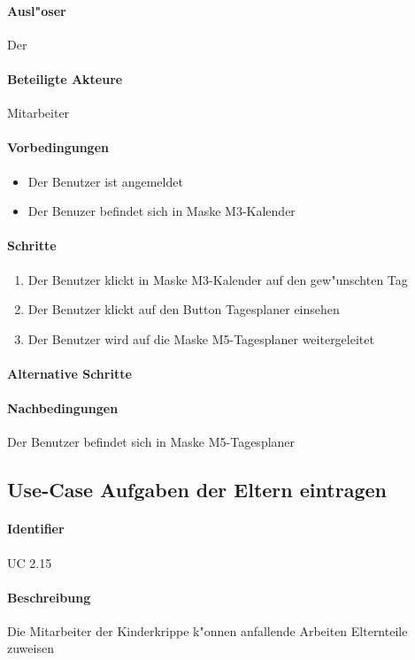   \paragraph{Ausl"oser}
  Der 
  \paragraph{Beteiligte Akteure}   \leavevmode \newline
    Mitarbeiter
  \paragraph{Vorbedingungen}
  \begin{itemize}
   \item Der Benutzer ist angemeldet
   \item Der Benuzer befindet sich in Maske M3-Kalender
  \end{itemize}

  \paragraph{Schritte}
  \begin{enumerate}
   \item Der Benutzer klickt in Maske M3-Kalender auf den gew"unschten Tag
   \item Der Benutzer klickt auf den Button \dq Tagesplaner einsehen\dq
   \item Der Benutzer wird auf die Maske M5-Tagesplaner weitergeleitet
  \end{enumerate}

  \paragraph{Alternative Schritte}
  \paragraph{Nachbedingungen}
  Der Benutzer befindet sich in Maske M5-Tagesplaner

 
 \newpage
 \subsection{Use-Case Aufgaben der Eltern eintragen}
  \paragraph{Identifier}
  UC 2.15
  \paragraph{Beschreibung}
  Die Mitarbeiter der Kinderkrippe k"onnen anfallende Arbeiten Elternteile zuweisen
